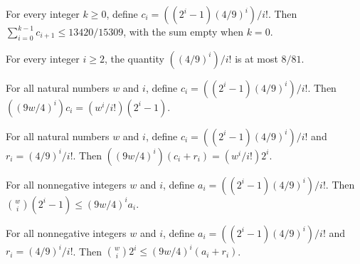 \begin{theorem}
\label{FABL.SwitchingCode.sum_fullCoefficient_range}
\leanok
{}
For every integer $k\ge 0$, define $c_i=((2^i-1)(4/9)^i)/i!$. Then
$\sum_{i=0}^{k-1}c_{i+1}\le 13420/15309$, with the sum empty when $k=0$.
\end{theorem}

\begin{theorem}
\label{FABL.SwitchingCode.finalRemainder_le}
\leanok
{}
For every integer $i \ge 2$, the quantity $((4/9)^i)/i!$ is at most $8/81$.
\end{theorem}

\begin{theorem}
\label{FABL.SwitchingCode.scale_mul_fullCoefficient}
\leanok
{}
For all natural numbers $w$ and $i$, define $c_i=((2^i-1)(4/9)^i)/i!$. Then
$((9w/4)^i)c_i=(w^i/i!)(2^i-1)$.
\end{theorem}

\begin{theorem}
\label{FABL.SwitchingCode.scale_mul_finalCoefficient}
\leanok
{}
For all natural numbers $w$ and $i$, define $c_i=((2^i-1)(4/9)^i)/i!$ and
$r_i=(4/9)^i/i!$. Then $((9w/4)^i)(c_i+r_i)=(w^i/i!)2^i$.
\end{theorem}

\begin{theorem}
\label{FABL.SwitchingCode.choose_full_le}
\leanok
{}
For all nonnegative integers $w$ and $i$, define $a_i=((2^i-1)(4/9)^i)/i!$. Then
$\binom{w}{i}(2^i-1)\leq (9w/4)^i a_i$.
\end{theorem}

\begin{theorem}
\label{FABL.SwitchingCode.choose_final_le}
\leanok
{}
For all nonnegative integers $w$ and $i$, define $a_i=((2^i-1)(4/9)^i)/i!$ and
$r_i=(4/9)^i/i!$. Then $\binom{w}{i}2^i\leq (9w/4)^i(a_i+r_i)$.
\end{theorem}

